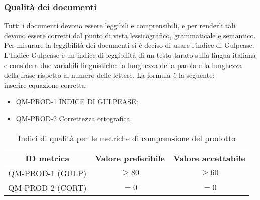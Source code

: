 \documentclass[../piano_di_qualifica.tex]{subfiles}
\begin{document}
\subsubsection{Qualità dei documenti}

Tutti i documenti devono essere leggibili e comprensibili, e per renderli tali devono essere corretti dal punto di vista lessicografico, grammaticale e semantico.
Per misurare la leggibilità dei documenti si è deciso di usare l’indice di Gulpease. L'Indice Gulpease è un indice di leggibilità di un testo tarato sulla lingua italiana e considera due variabili linguistiche: la lunghezza della parola e la lunghezza della frase rispetto al numero delle lettere.
La formula è la seguente:  \\
inserire equazione corretta:\\


\begin{itemize}
\item QM-PROD-1 INDICE DI GULPEASE;
\item QM-PROD-2 Correttezza ortografica.
\end{itemize}


\begin{table}[!ht]
\centering
\begin{tabular}{|c|c|c|}
		\hline
		\rowcolor{lightgray}
		\textbf{ID metrica} & \textbf{Valore preferibile} & \textbf{Valore accettabile} \\
		\hline 
		QM-PROD-1 (GULP) & \(\ge 80\) & \(\ge 60\) \\
 		\hline
		QM-PROD-2 (CORT) & \(= 0\) & \(= 0\) \\
		\hline
\end{tabular}
\caption{Indici di qualità per le metriche di comprensione del prodotto}
\end{table}
\end{document}
